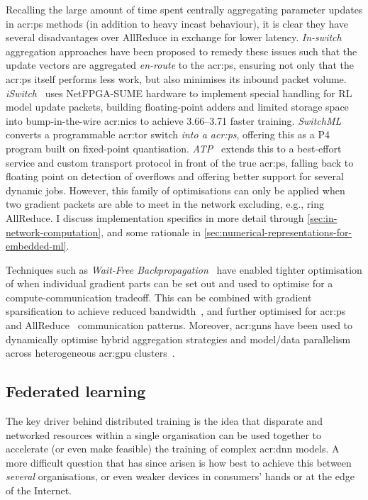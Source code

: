 Recalling the large amount of time spent centrally aggregating parameter updates in \gls{acr:ps} methods (in addition to heavy incast behaviour), it is clear they have several disadvantages over AllReduce in exchange for lower latency.
\emph{In-switch} aggregation approaches have been proposed to remedy these issues such that the update vectors are aggregated \emph{en-route} to the \gls{acr:ps}, ensuring not only that the \gls{acr:ps} itself performs less work, but also minimises its inbound packet volume.
\emph{iSwitch}~\parencite{DBLP:conf/isca/LiLYCSH19} uses NetFPGA-SUME hardware to implement special handling for RL model update packets, building floating-point adders and limited storage space into bump-in-the-wire \glspl{acr:nic} to achieve \qtyrange{3.66}{3.71}{\times} faster training.
\emph{SwitchML}~\parencite{DBLP:conf/nsdi/SapioC0NKKKMPR21} converts a programmable \gls{acr:tor} switch \emph{into a \gls{acr:ps}}, offering this as a P4 program built on fixed-point quantisation.
\emph{ATP}~\parencite{DBLP:conf/nsdi/LaoLMCWAS21} extends this to a best-effort service and custom transport protocol in front of the true \gls{acr:ps}, falling back to floating point on detection of overflows and offering better support for several dynamic jobs.
However, this family of optimisations can only be applied when two gradient packets are able to meet in the network excluding, e.g., ring AllReduce.
I discuss implementation specifics in more detail through \cref{sec:in-network-computation}, and some rationale in \cref{sec:numerical-representations-for-embedded-ml}.

Techniques such as \emph{Wait-Free Backpropagation}~\parencite{DBLP:conf/usenix/ZhangZXDHLHWXX17,DBLP:conf/ppopp/AwanHHP17} have enabled tighter optimisation of when individual gradient parts can be set out and used to optimise for a compute-communication tradeoff.
This can be combined with gradient sparsification to achieve reduced bandwidth~\parencite{DBLP:conf/infocom/ShiWCLQLZ20}, and further optimised for \gls{acr:ps}~\parencite{DBLP:conf/infocom/WangLG20} and AllReduce~\parencite{DBLP:conf/infocom/BaoPCW20} communication patterns.
Moreover, \glspl{acr:gnn} have been used to dynamically optimise hybrid aggregation strategies and model/data parallelism across heterogeneous \gls{acr:gpu} clusters~\parencite{DBLP:conf/conext/0001ZLLDWZYL20}.

\subsection{Federated learning}
The key driver behind distributed training is the idea that disparate and networked resources within a single organisation can be used together to accelerate (or even make feasible) the training of complex \gls{acr:dnn} models.
A more difficult question that has since arisen is how best to achieve this between \emph{several} organisations, or even weaker devices in consumers' hands or at the edge of the Internet.

